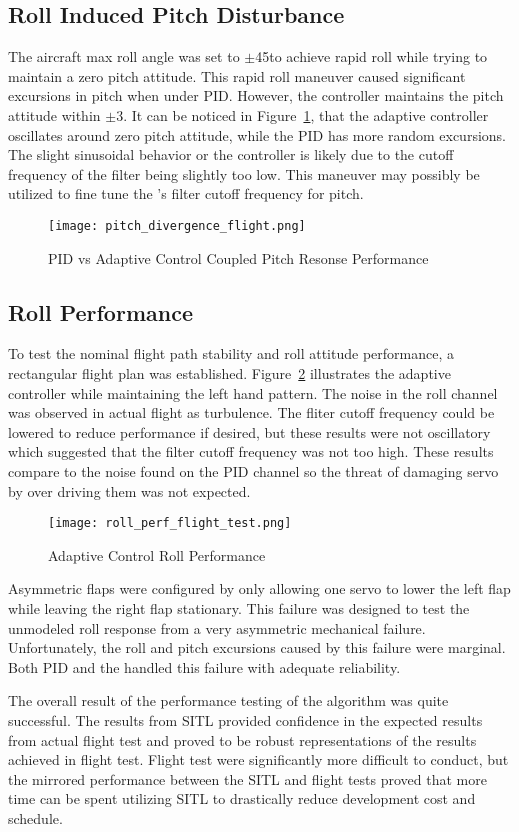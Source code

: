 \subsection{Roll Induced Pitch Disturbance}
The aircraft max roll angle was set to $\pm$45\degrees to achieve rapid roll while trying to maintain a zero pitch attitude.  This rapid roll maneuver caused significant excursions in pitch when under \ac{PID}.  However, the \Lone controller maintains the pitch attitude within $\pm$3\degrees.  It can be noticed in Figure~\ref{fig:pitch_divergence_flight}, that the adaptive controller oscillates around zero pitch attitude, while the \ac{PID} has more random excursions.  The slight sinusoidal behavior or the \Lone controller is likely due to the cutoff frequency of the filter being slightly too low.  This maneuver may possibly be utilized to fine tune the \Lone's filter cutoff frequency for pitch.
\begin{figure}[h!]
 \centering
  \texttt{[image: pitch\_divergence\_flight.png]}
  \caption{PID vs \Lone Adaptive Control Coupled Pitch Resonse Performance}
  \label{fig:pitch_divergence_flight}
\end{figure}

\subsection{Roll Performance}
To test the nominal flight path stability and roll attitude performance, a rectangular flight plan was established.  Figure~\ref{fig:roll_perf_flight_test} illustrates the \Lone adaptive controller while maintaining the left hand pattern.  The noise in the roll channel was observed in actual flight as turbulence.  The fliter cutoff frequency could be lowered to reduce performance if desired, but these results were not oscillatory which suggested that the filter cutoff frequency was not too high.  These results compare to the noise found on the \ac{PID} channel so the threat of damaging servo by over driving them was not expected.
\begin{figure}[h!]
 \centering
  \texttt{[image: roll\_perf\_flight\_test.png]}
  \caption{\Lone Adaptive Control Roll Performance}
  \label{fig:roll_perf_flight_test}
\end{figure}

Asymmetric flaps were configured by only allowing one servo to lower the left flap while leaving the right flap stationary.  This failure was designed to test the unmodeled roll response from a very asymmetric mechanical failure.  Unfortunately, the roll and pitch excursions caused by this failure were marginal.  Both \ac{PID} and the \Lone handled this failure with adequate reliability. 

The overall result of the performance testing of the \Lone algorithm was quite successful.  The results from \ac{SITL} provided confidence in the expected results from actual flight test and proved to be robust representations of the results achieved in flight test.  Flight test were significantly more difficult to conduct, but the mirrored performance between the \ac{SITL} and flight tests proved that more time can be spent utilizing \ac{SITL} to drastically reduce development cost and schedule.
